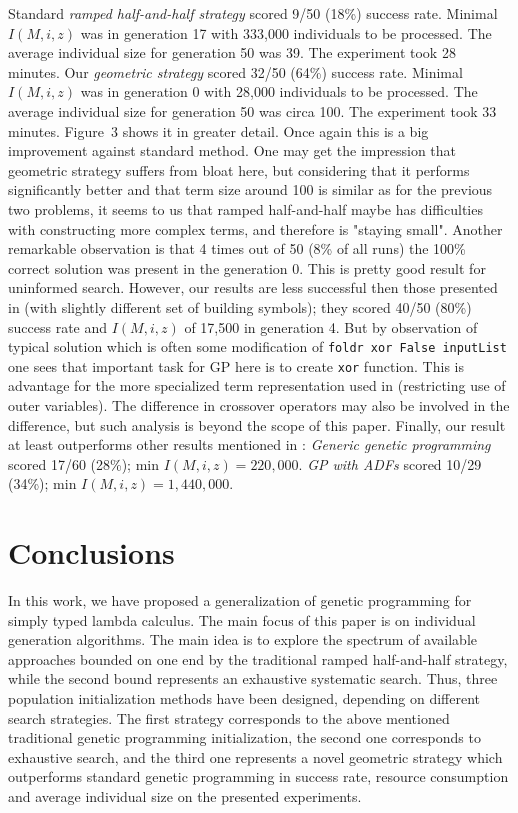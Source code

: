 \documentclass[conference]{IEEEtran}
\begin{document}
Standard \textit{ramped half-and-half strategy} scored 9/50 (18\%) success rate. 
Minimal $I(M,i,z)$ was in generation 17 with 333,000 individuals to be processed.
The average individual size for generation 50 was 39.
The experiment took 28 minutes.
Our \textit{geometric strategy} scored 32/50 (64\%) success rate. 
Minimal $I(M,i,z)$ was in generation 0 with 28,000 individuals to be processed.
The average individual size for generation 50 was circa 100.
The experiment took 33 minutes.
Figure~3 shows it in greater detail.
Once again this is a big improvement against standard method. 
One may get the impression that geometric strategy suffers from bloat here,
but considering that it performs significantly better and
that term size around 100 is similar as for the previous two problems, 
it seems to us that ramped half-and-half maybe has difficulties with 
constructing more complex terms, and therefore is "staying small".
Another remarkable observation is that 4 times out of 50 (8\% of all runs) 
the 100\% correct solution was present in the generation 0. This is pretty good
result for uninformed search. However, our results are less successful 
then those presented in \cite{yu01} (with slightly different set of 
building symbols); they scored 40/50 (80\%) success rate and $I(M,i,z)$ of 
17,500 in generation 4. But by observation of typical solution which is often
some modification of \texttt{foldr xor False inputList} one sees that important task
for GP here is to create \texttt{xor} function. This is advantage for the more specialized term representation used in \cite{yu01} 
(restricting use of outer variables). 
The difference in crossover operators may also be involved in the difference, 
but such analysis is beyond the scope of this paper. Finally, our result at least outperforms other results mentioned in \cite{yu01}: \textit{Generic genetic programming} 
scored 17/60 (28\%); min $I(M,i,z) = 220,000$. \textit{GP with ADFs} 
scored 10/29 (34\%); min $I(M,i,z) = 1,440,000$.

\section{Conclusions}
\label{conclusions}

In this work, we have proposed a generalization of genetic programming 
for simply typed lambda calculus. The main focus of this paper is on individual generation algorithms. 
The main idea is to explore the spectrum of available approaches bounded on one end by the traditional
ramped half-and-half strategy, while the second bound represents an exhaustive systematic search. 
Thus, three population initialization methods have been designed, 
depending on different search strategies. 
The first strategy corresponds to the above mentioned traditional genetic programming initialization,  
the second one corresponds to exhaustive search, and the third one 
represents a novel geometric strategy which outperforms standard genetic 
programming in success rate, resource consumption and average individual size 
on the presented experiments. 
\end{document}
